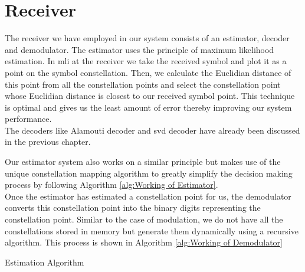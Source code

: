 \section{Receiver}
The receiver we have employed in our system consists of an estimator, decoder and demodulator. The estimator uses the principle of maximum likelihood estimation. In \acrshort{mli} at the receiver we take the received symbol and plot it as a point on the symbol constellation. Then, we calculate the Euclidian distance of this point from all the constellation points and select the constellation point whose Euclidian distance is closest to our received symbol point. This technique is optimal and gives us the least amount of error thereby improving our system performance.\\

The decoders like Alamouti decoder and \acrshort{svd} decoder have already been discussed in the previous chapter.

Our estimator system also works on a similar principle but makes use of the unique constellation mapping algorithm to greatly simplify the decision making process by following Algorithm \ref{alg:Working of Estimator}.\\

Once the estimator has estimated a constellation point for us, the demodulator converts this constellation point into the binary digits representing the constellation point. Similar to the case of modulation, we do not have all the constellations stored in memory but generate them dynamically using a recursive algorithm. This process is shown in Algorithm \ref{alg:Working of Demodulator} 

\begin{algorithm}[!htbp]
\caption{Estimation Algorithm}
\label{alg:Working of Estimator}
\begin{algorithmic}
		\ENDIF
		\ENDIF
	\ENDIF
\ENDWHILE
\end{algorithmic}
\end{algorithm} 

